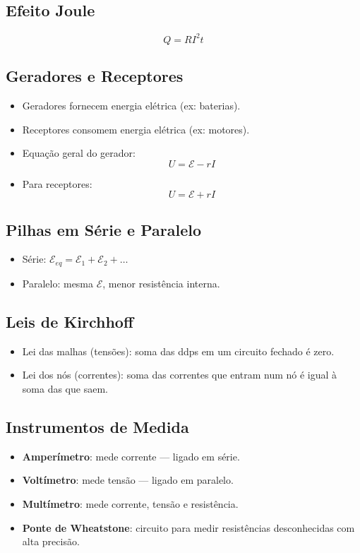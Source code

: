 \documentclass[a4paper,12pt]{article}
\begin{document}
\begin{multicols}{2}
\subsection{Efeito Joule}
\[
    Q = R I^2 t
\]

\subsection{Geradores e Receptores}
\begin{itemize}
    \item Geradores fornecem energia elétrica (ex: baterias).
    \item Receptores consomem energia elétrica (ex: motores).
    \item Equação geral do gerador:
    \[
        U = \mathcal{E} - r I
    \]
    \item Para receptores:
    \[
        U = \mathcal{E} + r I
    \]
\end{itemize}

\subsection{Pilhas em Série e Paralelo}
\begin{itemize}
    \item Série: $ \mathcal{E}_{eq} = \mathcal{E}_1 + \mathcal{E}_2 + \dots$
    \item Paralelo: mesma $ \mathcal{E}$, menor resistência interna.
\end{itemize}

\subsection{Leis de Kirchhoff}
\begin{itemize}
    \item Lei das malhas (tensões): soma das ddps em um circuito fechado é zero.
    \item Lei dos nós (correntes): soma das correntes que entram num nó é igual à soma das que saem.
\end{itemize}

\subsection{Instrumentos de Medida}
\begin{itemize}
    \item \textbf{Amperímetro}: mede corrente — ligado em série.
    \item \textbf{Voltímetro}: mede tensão — ligado em paralelo.
    \item \textbf{Multímetro}: mede corrente, tensão e resistência.
    \item \textbf{Ponte de Wheatstone}: circuito para medir resistências desconhecidas com alta precisão.
\end{itemize}


\end{multicols}
\end{document}
